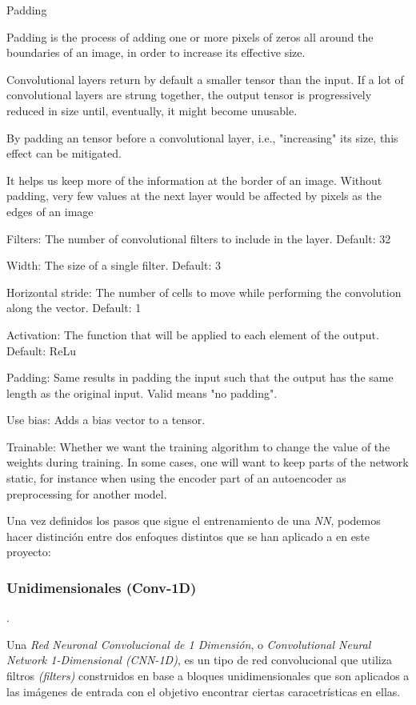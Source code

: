 Padding

Padding is the process of adding one or more pixels of zeros all around the boundaries of an image, in order to increase its effective size.

Convolutional layers return by default a smaller tensor than the input. If a lot of convolutional layers are strung together, the output tensor is progressively reduced in size until, eventually, it might become unusable.

By padding an tensor before a convolutional layer, i.e., "increasing" its size, this effect can be mitigated.

It helps us keep more of the information at the border of an image. Without padding, very few values at the next layer would be affected by pixels as the edges of an image


                

Filters: The number of convolutional filters to include in the layer. Default: 32

Width: The size of a single filter. Default: 3

Horizontal stride: The number of cells to move while performing the convolution along the vector. Default: 1

Activation: The function that will be applied to each element of the output. Default: ReLu

Padding: Same results in padding the input such that the output has the same length as the original input. Valid means "no padding".

Use bias: Adds a bias vector to a tensor.

Trainable: Whether we want the training algorithm to change the value of the weights during training. In some cases, one will want to keep parts of the network static, for instance when using the encoder part of an autoencoder as preprocessing for another model.

            \cite{KL-Divergence}

            Una vez definidos los pasos que sigue el entrenamiento de una \textit{NN}, podemos hacer distinción entre dos enfoques distintos que se han aplicado a en este proyecto:


            \subsubsection{Unidimensionales (Conv-1D)}.
            
                Una \textit{Red Neuronal Convolucional de 1 Dimensión}, o \textit{Convolutional Neural Network 1-Dimensional (CNN-1D)}, es un tipo de red convolucional que utiliza filtros \textit{(filters)} construidos en base a bloques unidimensionales que son aplicados a las imágenes de entrada con el objetivo encontrar ciertas caracetrísticas en ellas.


